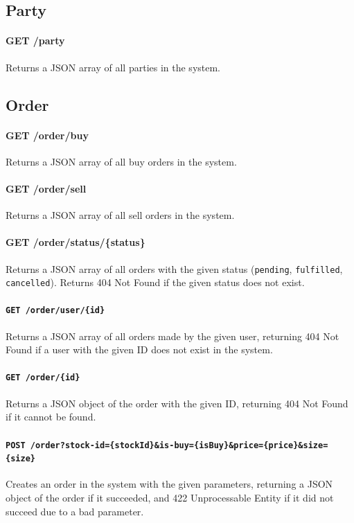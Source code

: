 \documentclass{article}
\begin{document}
\subsection{Party}

\paragraph{GET /party} Returns a JSON array of all parties in the system.

\subsection{Order}

\paragraph{GET /order/buy} Returns a JSON array of all buy orders in the system.

\paragraph{GET /order/sell} Returns a JSON array of all sell orders in the system.

\paragraph{GET /order/status/\{status\}} Returns a JSON array of all orders with the given status (\texttt{pending}, \texttt{fulfilled}, \texttt{cancelled}). Returns 404 Not Found if the given status does not exist.

\paragraph{\texttt{GET /order/user/\{id\}}} Returns a JSON array of all orders made by the given user, returning 404 Not Found if a user with the given ID does not exist in the system.

\paragraph{\texttt{GET /order/\{id\}}} Returns a JSON object of the order with the given ID, returning 404 Not Found if it cannot be found.

\paragraph{\texttt{POST /order?stock-id=\{stockId\}\&is-buy=\{isBuy\}\&price=\{price\}\&size=\{size\}}} Creates an order in the system with the given parameters, returning a JSON object of the order if it succeeded, and 422 Unprocessable Entity if it did not succeed due to a bad parameter.
\end{document}
